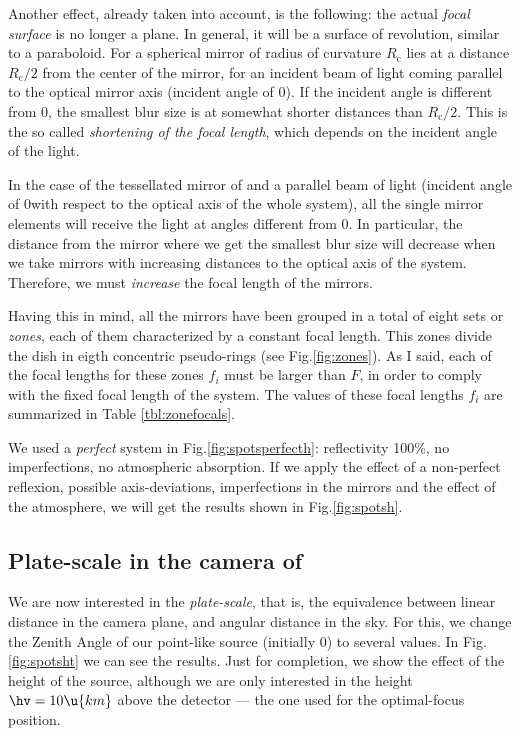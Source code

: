 \colldeltafig

Another effect, already taken into account, is the following: the
actual \emph{focal surface} is no longer a plane. In general, it will
be a surface of revolution, similar to a paraboloid. For a spherical
mirror of radius of curvature $R_{\mathrm{c}}$ lies at a distance
$R_{\mathrm{c}}/2$ from the center of the mirror, for an incident beam
of light coming parallel to the optical mirror axis (incident angle of
0\deg).  If the incident angle is different from 0\deg, the smallest
blur size is at somewhat shorter distances than $R_{\mathrm{c}}/2$.
This is the so called \emph{shortening of the focal length}, which
depends on the incident angle of the light.

In the case of the tessellated mirror of \MAGIC and a parallel beam of
light (incident angle of 0\deg with respect to the optical axis of the
whole system), all the single mirror elements will receive the light
at angles different from 0\deg. In particular, the distance from the
mirror where we get the smallest blur size will decrease when we take
mirrors with increasing distances to the optical axis of the system.
Therefore, we must \emph{increase} the focal length of the mirrors.

Having this in mind, all the mirrors have been grouped in a total of
eight sets or \emph{zones}, each of them characterized by a constant
focal length. This zones divide the dish in eigth concentric
pseudo-rings (see Fig.\ref{fig:zones}). As I said, each of the
focal lengths for these zones $f_i$ must be larger than $F$, in order
to comply with the fixed focal length of the system. The values of
these focal lengths $f_i$ are summarized in Table
\ref{tbl:zonefocals}.

We used a \emph{perfect} system in Fig.\ref{fig:spotsperfecth}:
reflectivity 100\%, no imperfections, no atmospheric absorption. If we
apply the effect of a non-perfect reflexion, possible axis-deviations,
imperfections in the mirrors and the effect of the atmosphere, we will
get the results shown in Fig.\ref{fig:spotsh}.

\subsection{Plate-scale in the camera of \MAGIC}

We are now interested in the \emph{plate-scale}, that is, the
equivalence between linear distance in the camera plane, and angular
distance in the sky. For this, we change the Zenith Angle of our
point-like source (initially 0\deg) to several values. In
Fig.\ref{fig:spotsht} we can see the results. Just for completion, we
show the effect of the height of the source, although we are only
interested in the height $\hv=10\u{km}$ above the detector --- the one
used for the optimal-focus position.

